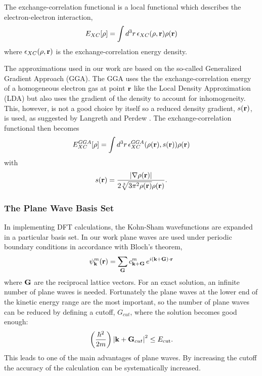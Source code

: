 The exchange-correlation functional is a local functional which describes the electron-electron interaction,
\begin{equation}
\label{eq:XCfunctional}
 E_{XC}[\rho] = \int d^3r\, \epsilon_{XC}(\rho, {\mathrm{\mathbf{\bm{r}}}})\rho({\mathrm{\mathbf{\bm{r}}}})
\end{equation}
where $\epsilon_{XC}(\rho, {\mathrm{\mathbf{\bm{r}}}})$ is the exchange-correlation energy density.

The approximations used in our work are based on the so-called Generalized Gradient Approach (GGA). The GGA uses the the exchange-correlation energy of a homogeneous electron gas at point ${\mathrm{\mathbf{\bm{r}}}}$ like the Local Density Approximation (LDA) \cite{kohn1965} but also uses the gradient of the density to account for inhomogeneity. This, however, is not a good choice by itself so a reduced density gradient, $s({\mathrm{\mathbf{\bm{r}}}})$, is used, as suggested by Langreth and Perdew \cite{langreth1977}. The exchange-correlation functional then becomes
\begin{equation}
  E_{XC}^{GGA}[\rho] = \int d^3r\, \epsilon_{XC}^{GGA}(\rho({\mathrm{\mathbf{\bm{r}}}}), s({\mathrm{\mathbf{\bm{r}}}}))\rho({\mathrm{\mathbf{\bm{r}}}})
\end{equation}
with
\begin{equation}
\label{eq:GGAreducedDensityGradient}
 s({\mathrm{\mathbf{\bm{r}}}}) = \frac{\left|\nabla \rho({\mathrm{\mathbf{\bm{r}}}})\right|}{2\sqrt[3]{3\pi^2\rho({\mathrm{\mathbf{\bm{r}}}})} \rho({\mathrm{\mathbf{\bm{r}}}})}.
\end{equation}

\subsubsection{The Plane Wave Basis Set}
In implementing DFT calculations, the Kohn-Sham wavefunctions are expanded in a particular basis set. In our work plane waves are used under periodic boundary conditions in accordance with Bloch's theorem,
\begin{equation}
\label{eq:blochsTherom}
 \psi_{\mathrm{\mathbf{\bm{k}}}}^{m}({\mathrm{\mathbf{\bm{r}}}}) = \sum_{\mathrm{\mathbf{\bm{G}}}}c_{{\mathrm{\mathbf{\bm{k}}}} + {\mathrm{\mathbf{\bm{G}}}}}^m\, e^{i({\mathrm{\mathbf{\bm{k}}}}+{\mathrm{\mathbf{\bm{G}}}})\cdot{\ensuremath{\mathrm{\mathbf{\bm{r}}}}}}
\end{equation}
where ${\mathrm{\mathbf{\bm{G}}}}$ are the reciprocal lattice vectors. %
For an exact solution, an infinite number of plane waves is needed. Fortunately the plane waves at the lower end of the kinetic energy range are the most important, so the number of plane waves can be reduced by defining a cutoff, $G_{cut}$, where the solution becomes good enough:
\begin{equation}
 \left( \frac{\hbar^2}{2m} \right) \left| {\mathrm{\mathbf{\bm{k}}}} + {\mathrm{\mathbf{\bm{G}}}}_{cut} \right|^2 \le E_\mathrm{cut}.
\end{equation}
This leads to one of the main advantages of plane waves. By increasing the cutoff the accuracy of the calculation can be systematically increased. 

